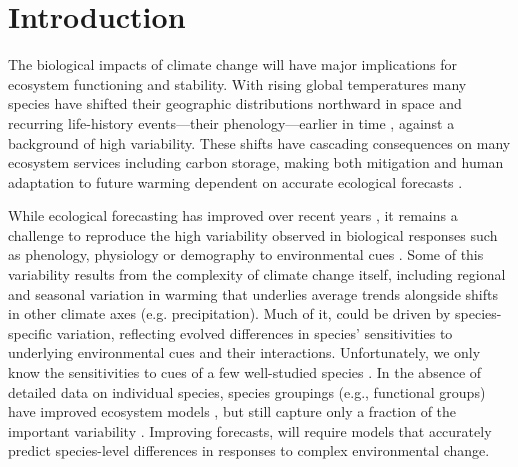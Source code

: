 \documentclass[11pt]{article}
\begin{document}
\section*{Introduction}
The biological impacts of climate change will have major implications for ecosystem functioning and stability. With rising global temperatures many species have shifted their geographic distributions northward in space and recurring life-history events---their phenology---earlier in time \citep{IPCC:2014sm,parmesan2003}, against a background of high variability. These shifts have cascading consequences on many ecosystem services including carbon storage, making both mitigation and human adaptation to future warming dependent on accurate ecological forecasts \citep{richardson2013}. 

While ecological forecasting has improved over recent years \citep{dietze2017ecological,lewis2022power}, it remains a challenge to reproduce the high variability observed in biological responses such as phenology, physiology or demography to environmental cues \citep{IPCC:2014sm}. Some of this variability results from the complexity of climate change itself, including regional and seasonal variation in warming that underlies average trends alongside shifts in other climate axes (e.g. precipitation). Much of it, could be driven by species-specific variation, reflecting evolved differences in species' sensitivities to underlying environmental cues and their interactions. Unfortunately, we only know the sensitivities to cues of a few well-studied species \citep{chuinearees,ettinger2020}. In the absence of detailed data on individual species, species groupings (e.g., functional groups) have improved ecosystem models \citep{ed2001,griffith2020}, but still capture only a fraction of the important variability \citep{fuccillo2022}. Improving forecasts, will require models that accurately predict species-level differences in responses to complex environmental change.
\end{document}
